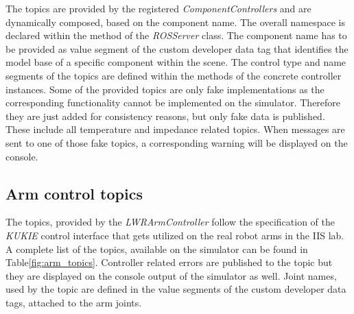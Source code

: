 The topics are provided by the registered \emph{ComponentControllers} and are dynamically composed, based on the component name. The overall namespace is declared within the  method of the \emph{ROSServer} class. The component name has to be provided as value segment of the custom developer data tag that identifies the model base of a specific component within the scene. The control type and name segments of the topics are defined within the  methods of the concrete controller instances. Some of the provided topics are only fake implementations as the corresponding functionality cannot be implemented on the simulator. Therefore they are just added for consistency reasons, but only fake data is published. These include all temperature and impedance related topics. When messages are sent to one of those fake topics, a corresponding warning will be displayed on the console.

\subsection{Arm control topics}

The topics, provided by the \emph{LWRArmController} follow the specification of the \emph{KUKIE} control interface that gets utilized on the real robot arms in the IIS lab. A complete list of the topics, available on the simulator can be found in Table\ref{fig:arm_topics}. Controller related errors are published to the  topic but they are displayed on the console output of the simulator as well. Joint names, used by the  topic are defined in the value segments of the custom developer data tags, attached to the arm joints.

